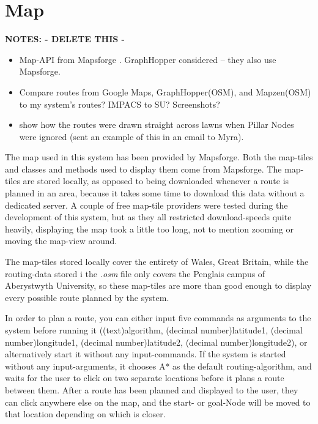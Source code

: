 \section{Map}
\textbf{NOTES: - DELETE THIS -}
\begin{itemize}
	\item Map-API from Mapsforge \cite{Mapsforge}. GraphHopper considered -- they also use Mapsforge.
	\item Compare routes from Google Maps, GraphHopper(OSM), and Mapzen(OSM) to my system's routes? IMPACS to SU? Screenshots?
	\item show how the routes were drawn straight across lawns when Pillar Nodes were ignored (sent an example of this in an email to Myra).
\end{itemize}

The map used in this system has been provided by Mapsforge\cite{Mapsforge,Mapsforge_map-tiles}. Both the map-tiles and classes and methods used to display them come from Mapsforge.
The map-tiles are stored locally, as opposed to being downloaded whenever a route is planned in an area, because it takes some time to download this data without a dedicated server. A couple of free map-tile providers were tested during the development of this system, but as they all restricted download-speeds quite heavily, displaying the map took a little too long, not to mention zooming or moving the map-view around.

The map-tiles stored locally cover the entirety of Wales, Great Britain, while the routing-data stored i the \textit{.osm} file only covers the Penglais campus of Aberystwyth University, so these map-tiles are more than good enough to display every possible route planned by the system.

In order to plan a route, you can either input five commands as arguments to the system before running it ((text)algorithm, (decimal number)latitude1, (decimal number)longitude1, (decimal number)latitude2, (decimal number)longitude2), or alternatively start it without any input-commands. If the system is started without any input-arguments, it chooses A* as the default routing-algorithm, and waits for the user to click on two separate locations before it plans a route between them. After a route has been planned and displayed to the user, they can click anywhere else on the map, and the start- or goal-Node will be moved to that location depending on which is closer.


